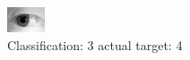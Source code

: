 \begin{figure}[h!]
\begin{center}
\includegraphics[width=0.60\columnwidth]{figures/ID1245_class_3_target_4.png}
\end{center}
\caption{ Classification: 3 actual target: 4}
\label{fig:ID1245_class_3_target_4}
\end{figure}
